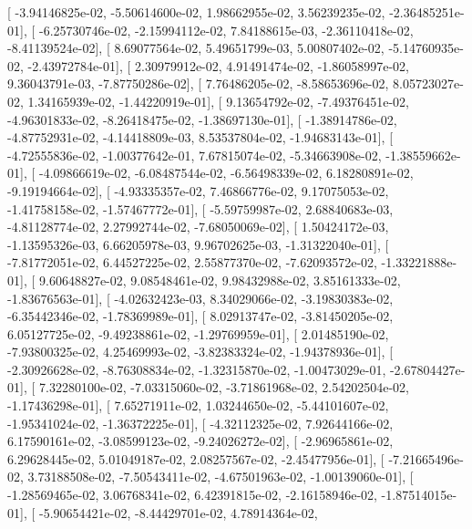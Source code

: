 \documentclass{article}
\begin{document}
       [ -3.94146825e-02,  -5.50614600e-02,   1.98662955e-02,
          3.56239235e-02,  -2.36485251e-01],
       [ -6.25730746e-02,  -2.15994112e-02,   7.84188615e-03,
         -2.36110418e-02,  -8.41139524e-02],
       [  8.69077564e-02,   5.49651799e-03,   5.00807402e-02,
         -5.14760935e-02,  -2.43972784e-01],
       [  2.30979912e-02,   4.91491474e-02,  -1.86058997e-02,
          9.36043791e-03,  -7.87750286e-02],
       [  7.76486205e-02,  -8.58653696e-02,   8.05723027e-02,
          1.34165939e-02,  -1.44220919e-01],
       [  9.13654792e-02,  -7.49376451e-02,  -4.96301833e-02,
         -8.26418475e-02,  -1.38697130e-01],
       [ -1.38914786e-02,  -4.87752931e-02,  -4.14418809e-03,
          8.53537804e-02,  -1.94683143e-01],
       [ -4.72555836e-02,  -1.00377642e-01,   7.67815074e-02,
         -5.34663908e-02,  -1.38559662e-01],
       [ -4.09866619e-02,  -6.08487544e-02,  -6.56498339e-02,
          6.18280891e-02,  -9.19194664e-02],
       [ -4.93335357e-02,   7.46866776e-02,   9.17075053e-02,
         -1.41758158e-02,  -1.57467772e-01],
       [ -5.59759987e-02,   2.68840683e-03,  -4.81128774e-02,
          2.27992744e-02,  -7.68050069e-02],
       [  1.50424172e-03,  -1.13595326e-03,   6.66205978e-03,
          9.96702625e-03,  -1.31322040e-01],
       [ -7.81772051e-02,   6.44527225e-02,   2.55877370e-02,
         -7.62093572e-02,  -1.33221888e-01],
       [  9.60648827e-02,   9.08548461e-02,   9.98432988e-02,
          3.85161333e-02,  -1.83676563e-01],
       [ -4.02632423e-03,   8.34029066e-02,  -3.19830383e-02,
         -6.35442346e-02,  -1.78369989e-01],
       [  8.02913747e-02,  -3.81450205e-02,   6.05127725e-02,
         -9.49238861e-02,  -1.29769959e-01],
       [  2.01485190e-02,  -7.93800325e-02,   4.25469993e-02,
         -3.82383324e-02,  -1.94378936e-01],
       [ -2.30926628e-02,  -8.76308834e-02,  -1.32315870e-02,
         -1.00473029e-01,  -2.67804427e-01],
       [  7.32280100e-02,  -7.03315060e-02,  -3.71861968e-02,
          2.54202504e-02,  -1.17436298e-01],
       [  7.65271911e-02,   1.03244650e-02,  -5.44101607e-02,
         -1.95341024e-02,  -1.36372225e-01],
       [ -4.32112325e-02,   7.92644166e-02,   6.17590161e-02,
         -3.08599123e-02,  -9.24026272e-02],
       [ -2.96965861e-02,   6.29628445e-02,   5.01049187e-02,
          2.08257567e-02,  -2.45477956e-01],
       [ -7.21665496e-02,   3.73188508e-02,  -7.50543411e-02,
         -4.67501963e-02,  -1.00139060e-01],
       [ -1.28569465e-02,   3.06768341e-02,   6.42391815e-02,
         -2.16158946e-02,  -1.87514015e-01],
       [ -5.90654421e-02,  -8.44429701e-02,   4.78914364e-02,
\end{document}
